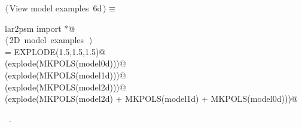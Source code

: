 \documentclass[11pt,oneside]{article}	%
\begin{document}
\begin{flushleft} \small
\begin{minipage}{\linewidth} \label{scrap20}
\protect{}$\langle\,$View model examples\nobreak\ {\footnotesize 6d}$\,\rangle\equiv$
\vspace{-1ex}
\begin{list}{}{} \item
\mbox{}\verb@from lar2psm import *@\\
\mbox{}\verb@@\hbox{$\langle\,$2D model examples\nobreak\ {\footnotesize {}}$\,\rangle$}\verb@@\\
\mbox{}\verb@explode = EXPLODE(1.5,1.5,1.5)@\\
\mbox{}\verb@VIEW(explode(MKPOLS(model0d)))@\\
\mbox{}\verb@VIEW(explode(MKPOLS(model1d)))@\\
\mbox{}\verb@VIEW(explode(MKPOLS(model2d)))@\\
\mbox{}\verb@VIEW(explode(MKPOLS(model2d) + MKPOLS(model1d) + MKPOLS(model0d)))@\\
\mbox{}\verb@@{\NWsep}
\end{list}
\vspace{-1ex}
\footnotesize\addtolength{\baselineskip}{-1ex}
\begin{list}{}{\setlength{\itemsep}{-\parsep}\setlength{\itemindent}{-\leftmargin}}
\item \NWtxtMacroRefIn\ .
\end{list}
\end{minipage}\\[4ex]
\end{flushleft}
\end{document}
